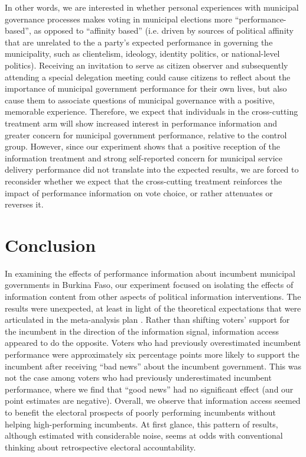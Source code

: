 \documentclass[11pt]{article}
\begin{document}
In other words, we are interested in whether personal experiences with municipal governance processes makes voting in municipal elections more ``performance-based'', as opposed to ``affinity based'' (i.e. driven by sources of political affinity that are unrelated to the a party's expected performance in governing the municipality, such as clientelism, ideology, identity politics, or national-level politics). Receiving an invitation to serve as citizen observer and subsequently attending a special delegation meeting could cause citizens to reflect about the importance of municipal government performance for their own lives, but also cause them to associate questions of municipal governance with a positive, memorable experience. Therefore, we expect that individuals in the cross-cutting treatment arm will show increased interest in performance information and greater concern for municipal government performance, relative to the control group. However, since our experiment shows that a positive reception of the information treatment and strong self-reported concern for municipal service delivery performance did not translate into the expected results, we are forced to reconsider whether we expect that the cross-cutting treatment reinforces the impact of performance information on vote choice, or rather attenuates or reverses it.  

\section{Conclusion}

In examining the effects of performance information about incumbent municipal governments in Burkina Faso, our experiment focused on isolating the effects of information content from other aspects of political information interventions. The results were unexpected, at least in light of the theoretical expectations that were articulated in the meta-analysis plan \citep{MetaPAP}. Rather than shifting voters' support for the incumbent in the direction of the information signal, information access appeared to do the opposite. Voters who had previously overestimated incumbent performance were approximately six percentage points more likely to support the incumbent after receiving ``bad news'' about the incumbent government. This was not the case among voters who had previously underestimated incumbent performance, where we find that ``good news'' had no significant effect (and our point estimates are negative). Overall, we observe that information access seemed to benefit the electoral prospects of poorly performing incumbents without helping high-performing incumbents. At first glance, this pattern of results, although estimated with considerable noise, seems at odds with conventional thinking about retrospective electoral accountability. 
\end{document}
